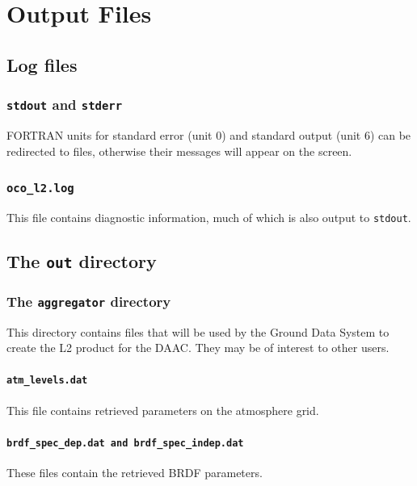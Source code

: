 \documentclass{article}
\begin{document}
\section{Output Files}

\subsection{Log files}

\subsubsection{\texttt{stdout} and \texttt{stderr}} 

FORTRAN units for standard error (unit 0) and standard output (unit 6)
can be redirected to files, otherwise their messages will appear on
the screen.

\subsubsection{\texttt{oco\_l2.log}}

This file contains diagnostic information, much of which is also
output to \texttt{stdout}.

\subsection{The \texttt{out} directory}

\subsubsection{The \texttt{aggregator} directory}

This directory contains files that will be used by the Ground Data
System to create the L2 product for the DAAC.  They may be of interest
to other users.

\paragraph{\texttt{atm\_levels.dat}}

This file contains retrieved parameters on the atmosphere grid.

\paragraph{\texttt{brdf\_spec\_dep.dat and brdf\_spec\_indep.dat}}

These files contain the retrieved BRDF parameters.
\end{document}
